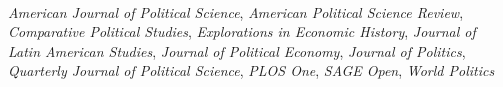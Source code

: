\documentclass[11pt]{article}
\begin{document}
\vspace{.2in}
\begin{minipage}[t]{.22\textwidth}
	 \\
\end{minipage}
\begin{minipage}[t]{.78\textwidth}
	\emph{American Journal of Political Science}, \emph{American Political Science Review}, \emph{Comparative Political Studies}, \emph{Explorations in Economic History}, \emph{Journal of Latin American Studies}, \emph{Journal of Political Economy}, \emph{Journal of Politics}, \emph{Quarterly Journal of Political Science}, \emph{PLOS One}, \emph{SAGE Open}, \emph{World Politics}
\end{minipage}








\clearpage \newpage
\vspace{.2in}
\begin{minipage}[t]{.21\textwidth}
	 \\
\end{minipage}
\end{document}
